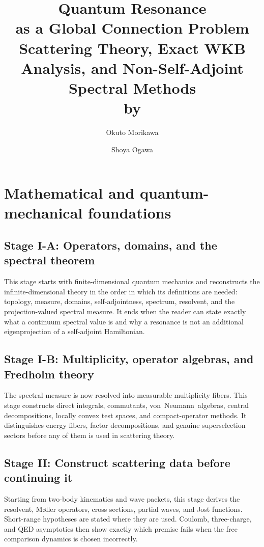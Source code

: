 \documentclass[11pt,openany]{book}
\title{\Huge Quantum Resonance\\ as a Global Connection Problem
\\[3ex]
\large Scattering Theory, Exact WKB Analysis, and Non-Self-Adjoint Spectral Methods
\\[5ex]
\Large by
}
\author{
\Large Okuto Morikawa
\and
\Large Shoya Ogawa
}
\date{}
\def\vN{von~Neumann}%
\theoremstyle{definition}
\newcommand{\learningstage}[3]{%
  \chapter{Stage #1: #2}%
  \begin{readercontract}#3\end{readercontract}%
}
\begin{document}
\frontmatter
\maketitle




\tableofcontents
\clearpage

\mainmatter




\part{Mathematical and quantum-mechanical foundations}

\learningstage{I-A}{Operators, domains, and the spectral theorem}{
This stage starts with finite-dimensional quantum mechanics and reconstructs
the infinite-dimensional theory in the order in which its definitions are
needed: topology, measure, domains, self-adjointness, spectrum, resolvent, and
the projection-valued spectral measure.  It ends when the reader can state
exactly what a continuum spectral value is and why a resonance is not an
additional eigenprojection of a self-adjoint Hamiltonian.}




\learningstage{I-B}{Multiplicity, operator algebras, and Fredholm theory}{
The spectral measure is now resolved into measurable multiplicity fibers.
This stage constructs direct integrals, commutants, \vN\ algebras,
central decompositions, locally convex test spaces, and compact-operator
methods.  It distinguishes energy fibers, factor decompositions, and genuine
superselection sectors before any of them is used in scattering theory.}




\learningstage{II}{Construct scattering data before continuing it}{
Starting from two-body kinematics and wave packets, this stage derives the
resolvent, M{\o}ller operators, cross sections, partial waves, and Jost
functions.  Short-range hypotheses are stated where they are used.  Coulomb,
three-charge, and QED asymptotics then show exactly which premise fails when
the free comparison dynamics is chosen incorrectly.}







\end{document}
